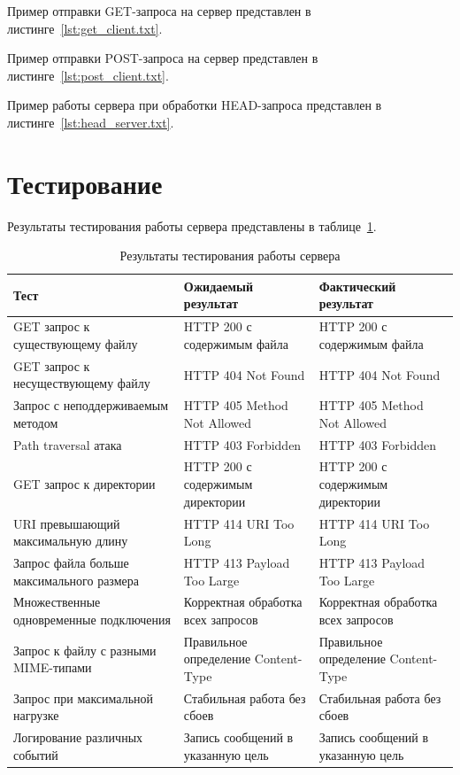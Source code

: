 
Пример отправки GET-запроса на сервер представлен в листинге~\ref{lst:get_client.txt}.


Пример отправки POST-запроса на сервер представлен в листинге~\ref{lst:post_client.txt}.


Пример работы сервера при обработки HEAD-запроса представлен в листинге~\ref{lst:head_server.txt}.



\section{Тестирование}

Результаты тестирования работы сервера представлены в таблице~\ref{tab:test_results}.

\begin{table}[H]
	\centering
	\caption{Результаты тестирования работы сервера}
	\label{tab:test_results}
	\begin{tabularx}{\textwidth}{|X|X|X|}
		\hline
		\textbf{Тест} & \textbf{Ожидаемый результат} & \textbf{Фактический результат} \\
		\hline
		GET запрос к существующему файлу & HTTP 200 с содержимым файла & HTTP 200 с содержимым файла \\
		\hline
		GET запрос к несуществующему файлу & HTTP 404 Not Found & HTTP 404 Not Found \\
		\hline
		Запрос с неподдерживаемым методом & HTTP 405 Method Not Allowed & HTTP 405 Method Not Allowed \\
		\hline
		Path traversal атака & HTTP 403 Forbidden & HTTP 403 Forbidden \\
		\hline
		GET запрос к директории & HTTP 200 с содержимым директории & HTTP 200 с содержимым директории \\
		\hline
		URI превышающий максимальную длину & HTTP 414 URI Too Long & HTTP 414 URI Too Long \\
		\hline
		Запрос файла больше максимального размера & HTTP 413 Payload Too Large & HTTP 413 Payload Too Large \\
		\hline
		Множественные одновременные подключения & Корректная обработка всех запросов & Корректная обработка всех запросов \\
		\hline
		Запрос к файлу с разными MIME-типами & Правильное определение Content-Type & Правильное определение Content-Type \\
		\hline
		Запрос при максимальной нагрузке & Стабильная работа без сбоев & Стабильная работа без сбоев \\
		\hline
		Логирование различных событий & Запись сообщений в указанную цель & Запись сообщений в указанную цель \\
		\hline
	\end{tabularx}
\end{table}

